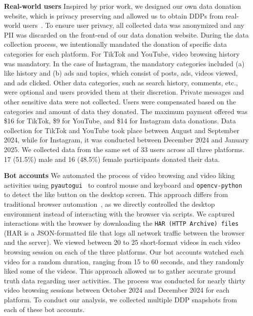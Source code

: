 \noindent
\textbf{Real-world users}
Inspired by prior work, we designed our own data donation website, which is privacy preserving and allowed us to obtain DDPs from real-world users~\cite{zannettou2024analyzing}. To ensure user privacy, all collected data was anonymized and any PII was discarded on the front-end of our data donation website. 
During the data collection process, we intentionally mandated the donation of specific data categories for each platform.
For TikTok and YouTube, video browsing history was mandatory.
In the case of Instagram, the mandatory categories included (a) like history and (b) ads and topics, which consist of posts, ads, videos viewed, and ads clicked.
Other data categories, such as search history, comments, etc., were optional and users provided them at their discretion.
Private messages and other sensitive data were not collected. 
Users were compensated based on the categories and amount of data they donated.
The maximum payment offered was \$16 for TikTok, \$9 for YouTube, and \$14 for Instagram data donations.
Data collection for TikTok and YouTube took place between August and September 2024, while for Instagram, it was conducted between December 2024 and January 2025.
We collected data from the same set of 33 users across all three platforms.
17 (51.5\%) male and 16 (48.5\%) female participants donated their data. 

\noindent
\textbf{Bot accounts}
We automated the process of video browsing and video liking activities using \texttt{pyautogui}~\cite{pyautogui} to control mouse and keyboard and \texttt{opencv-python}~\cite{opencv} to detect the like button on the desktop screen.
This approach differs from traditional browser automation~\cite{10.1145/3485447.3512102}, as we directly controlled the desktop environment instead of interacting with the browser via scripts.
We captured interactions with the browser by downloading the \texttt{HAR (HTTP Archive) files} (HAR is a JSON-formatted file that logs all network traffic between the browser and the server).
We viewed between 20 to 25 short-format videos in each video browsing session on each of the three platforms.
Our bot accounts watched each video for a random duration, ranging from 15 to 60 seconds, and they randomly liked some of the videos.
This approach allowed us to gather accurate ground truth data regarding user activities.
The process was conducted for nearly thirty video browsing sessions between October 2024 and December 2024 for each platform.
To conduct our analysis, we collected multiple DDP snapshots from each of these bot accounts. 


